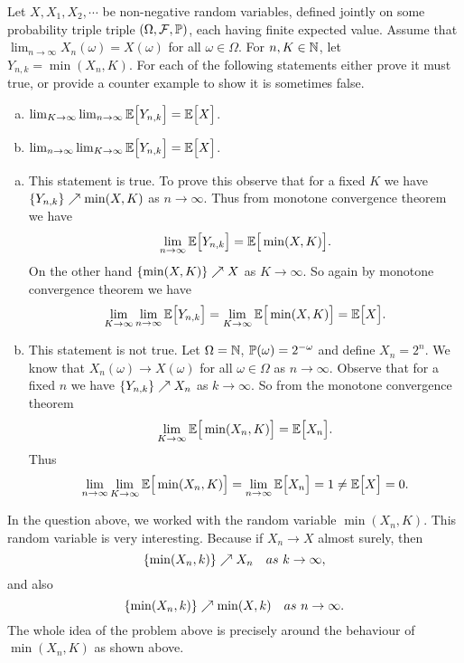\begin{problem}
	Let $ X,X_1,X_2,\cdots $ be non-negative random variables, defined jointly on some probability triple triple $ (\Omega,\mathcal{F},\mathbb{P}) $, each having finite expected value. Assume that $ \lim_{n\to\infty}X_n(\omega) = X(\omega) $ for all $ \omega\in \Omega $. For $ n,K \in \mathbb{N} $, let $ Y_{n,k}=\min(X_n,K) $. For each of the following statements either prove it must true, or provide a counter example to show it is sometimes false. 
	\begin{enumerate}[(a)]
		\item $ \lim_{K\to\infty}\lim_{n\to\infty} \mathbb{E}\big[Y_{n,k}\big] = \mathbb{E}\big[X\big] $.
		\item $ \lim_{n\to\infty}\lim_{K\to\infty} \mathbb{E}\big[Y_{n,k}\big] = \mathbb{E}\big[X\big] $.
	\end{enumerate}
\end{problem}
\begin{solution}
	\begin{enumerate}[(a)]
		\item This statement is true. To prove this observe that for a fixed $ K $ we have $ \{Y_{n,k}\}\nearrow \min(X,K)$ as $ n\to\infty $. Thus from monotone convergence theorem we have
		\[ \lim_{n\to\infty} \mathbb{E}\big[Y_{n,k}\big] = \mathbb{E}\big[\min(X,K)\big]. \]
		On the other hand $ \{\min(X,K)\}\nearrow X $ as $ K\to\infty $. So again by monotone convergence theorem we have
		\[ \lim_{K\to\infty}\lim_{n\to\infty} \mathbb{E}\big[Y_{n,k}\big] = \lim_{K\to\infty}\mathbb{E}\big[\min(X,K)\big] = \mathbb{E}\big[X\big].\]
		
		\item This statement is not true. Let $ \Omega=\mathbb{N} $, $ \mathbb{P}(\omega) = 2^{-\omega} $ and define $ X_n = 2^{n} $. We know that $ X_n(\omega)\to X(\omega) $ for all $ \omega\in\Omega $ as $ n\to\infty $. Observe that for a fixed $ n $ we have $ \{Y_{n,k}\}\nearrow X_n $ as $ k\to\infty $. So from the monotone convergence theorem 
		\[ \lim_{K\to\infty}\mathbb{E}\big[\min(X_n,K)\big] = \mathbb{E}\big[X_n\big]. \]
		Thus
		\[ \lim_{n\to\infty }\lim_{K\to\infty}\mathbb{E}\big[\min(X_n,K)\big] = \lim_{n\to\infty} \mathbb{E}\big[X_n\big] = 1 \neq \mathbb{E}\big[X\big] = 0. \]
	\end{enumerate}
\end{solution}
\begin{observation}
	In the question above, we worked with the random variable $ \min(X_n,K) $. This random variable is very interesting. Because if $ X_n\to X $ almost surely, then
	\[ \{\min(X_n,k)\} \nearrow X_n \quad as\ k\to\infty, \]
	and also
	\[ \set{\min(X_n,k)} \nearrow \min(X,k) \quad as\ n\to\infty. \]
	The whole idea of the problem above is precisely around the behaviour of $ \min(X_n,K) $ as shown above.
\end{observation}


